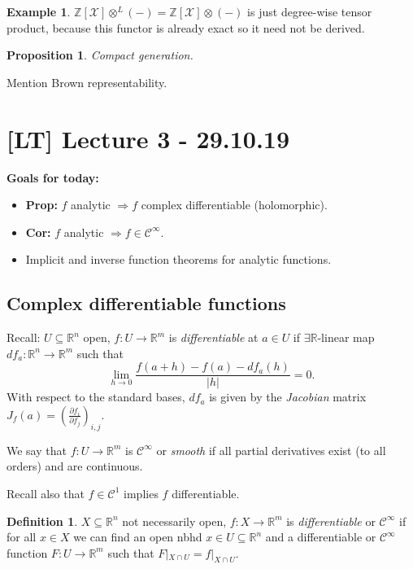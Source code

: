 \documentclass[11pt,A4]{article}
\theoremstyle{plain}
\newtheorem{prop}[thm]{Proposition}
\theoremstyle{definition}
\newtheorem{defn}[thm]{Definition}
\newtheorem{exa}[thm]{Example}
\theoremstyle{remark}
\newcommand{\Z}{\mathbb{Z}}
\newcommand{\R}{\mathbb{R}}
\newcommand{\1}{\mathbbm{1}}
\newcommand{\calC}{\mathcal{C}}
\newcommand{\X}{\mathcal{X}}
\newcommand{\ot}{\otimes}
\begin{document}
\begin{exa}
    $\Z[\X]\ot^{L}(-)=\Z[\X]\ot(-)$ is just degree-wise tensor product, because this functor is already exact so it need not be derived.
\end{exa}

\begin{prop}
    Compact generation.
\end{prop}

Mention Brown representability.

\section{[LT] Lecture 3 - 29.10.19}

\textbf{Goals for today:}
\begin{itemize}
    \item \textbf{Prop:} $f$ analytic $\Rightarrow f$ complex differentiable (holomorphic).
    \item \textbf{Cor:} $f$ analytic $\Rightarrow f\in \calC^{\infty}$.
    \item Implicit and inverse function theorems for analytic functions.
\end{itemize}

\subsection{Complex differentiable functions}

Recall: $U\subseteq \R^{n}$ open, $f\colon U\to \R^{m}$ is \textit{differentiable} at $a\in U$ if $\exists \R$-linear map $df_{a}\colon \R^{n}\to \R^{m}$ such that
\[ \lim_{h\to 0}\frac{f(a+h)-f(a)-df_{a}(h)}{|h|}=0.\]
With respect to the standard bases, $df_{a}$ is given by the \textit{Jacobian} matrix $J_{f}(a)=(\frac{\partial f_{i}}{\partial f_{j}})_{i,j}$.

We say that $f\colon U\to \R^{m}$ is $\calC^{\infty}$ or \textit{smooth} if all partial derivatives exist (to all orders) and are continuous.

Recall also that $f\in \calC^{1}$ implies $f$ differentiable.

\begin{defn}
    $X\subseteq \R^{n}$ not necessarily open, $f\colon X\to \R^{m}$ is \textit{differentiable} or $\calC^{\infty}$ if for all $x\in X$ we can find an open nbhd $x\in U\subseteq \R^{n}$ and a differentiable or $\calC^{\infty}$ function $F\colon U\to \R^{m}$ such that $F|_{X\cap U}=f|_{X\cap U}$.
\end{defn}
\end{document}
